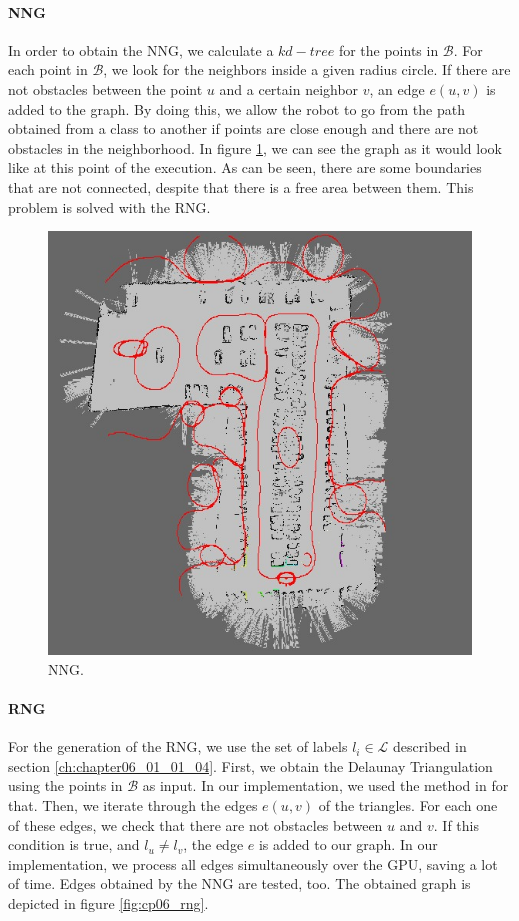 \paragraph{\acf{NNG}}\label{ch:chapter06_01_01_05_01}

In order to obtain the \ac{NNG}, we calculate a $kd-tree$ for the points in $\mathcal{B}$. For each point in $\mathcal{B}$, we look for the neighbors inside a given radius circle. If there are not obstacles between the point $u$ and a certain neighbor $v$, an edge $e(u,v)$ is added to the graph. By doing this, we allow the robot to go from the path obtained from a class to another if points are close enough and there are not obstacles in the neighborhood. In figure \ref{fig:cp06_nng}, we can see the graph as it would look like at this point of the execution. As can be seen, there are some boundaries that are not connected, despite that there is a free area between them. This problem is solved with the \acf{RNG}.

\begin{figure}[h!]
  \centering
  \includegraphics[width=\textwidth, height=0.75\textwidth]{figure3}
  \caption{\acf{NNG}.}
  \label{fig:cp06_nng}
\end{figure}

\paragraph{\acf{RNG}}\label{ch:chapter06_01_01_05_02}

For the generation of the \ac{RNG}, we use the set of labels $l_i \in \mathcal{L}$ described in section \ref{ch:chapter06_01_01_04}. First, we obtain the Delaunay Triangulation \citep{su1997comparison} using the points in $\mathcal{B}$ as input. In our implementation, we used the method in \cite{rong2008computing} for that. Then, we iterate through the edges $e(u,v)$ of the triangles. For each one of these edges, we check that there are not obstacles between $u$ and $v$. If this condition is true, and $l_u \neq l_v$, the edge $e$ is added to our graph. In our implementation, we process all edges simultaneously over the \acs{GPU}, saving a lot of time. Edges obtained by the \ac{NNG} are tested, too. The obtained graph is depicted in figure \ref{fig:cp06_rng}.

